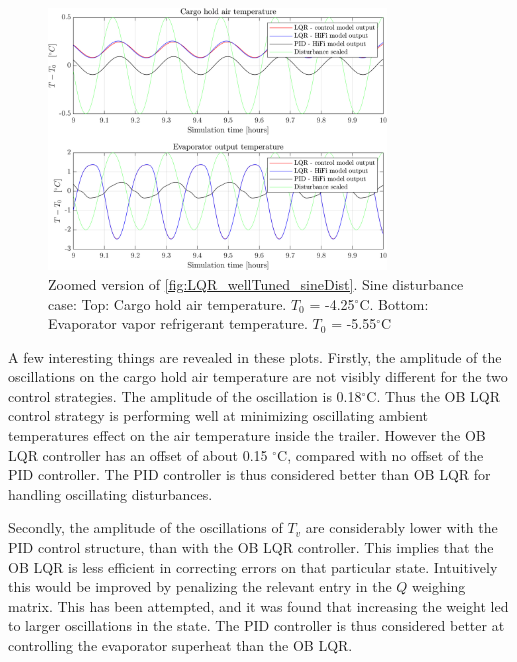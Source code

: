\begin{figure}[H]
	\centering
	\includegraphics[width=0.8\textwidth]{Graphics/fig_LQRvsKresten_sineDist_zoom.png}
	\caption{Zoomed version of \cref{fig:LQR_wellTuned_sineDist}. Sine disturbance case: Top: Cargo hold air temperature. $T_0$ = -4.25$^{\circ}$C. Bottom: Evaporator vapor refrigerant temperature. $T_0$ = -5.55$^{\circ}$C}
	\label{fig:LQR_wellTuned_sineDist_zoom}
\end{figure}

\noindent A few interesting things are revealed in these plots. 
Firstly, the amplitude of the oscillations on the cargo hold air temperature are not visibly different for the two control strategies. The amplitude of the oscillation is 0.18$^{\circ}$C. Thus the OB LQR control strategy is performing well at minimizing oscillating ambient temperatures effect on the air temperature inside the trailer. However the OB LQR controller has an offset of about 0.15 $ ^{\circ} $C, compared with no offset of the PID controller. The PID controller is thus considered better than OB LQR for handling oscillating disturbances.

Secondly, the amplitude of the oscillations of $T_v$ are considerably lower with the PID control structure, than with the OB LQR controller. This implies that the OB LQR is less efficient in correcting errors on that particular state. Intuitively this would be improved by penalizing the relevant entry in the $Q$ weighing matrix. This has been attempted, and it was found that increasing the weight led to larger oscillations in the state. The PID controller is thus considered better at controlling the evaporator superheat than the OB LQR. \\

